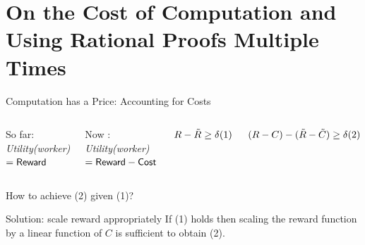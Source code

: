 \section{On the Cost of Computation and Using Rational Proofs Multiple Times}

\begin{frame}{Computation has a Price: Accounting for Costs}
	\begin{columns}
	\begin{block}{So far:}
		\textit{Utility(worker)} $ = \mathsf{Reward}$
	\end{block}
	\begin{block}{Now :}
		\textit{Utility(worker)} $= \mathsf{Reward} - \mathsf{Cost}$
	\end{block}
	\begin{block}{}
		$R - \tilde{R} \geq \delta \hspace*{\fill} (1) \hspace*{\fill}$
	\end{block}
	\begin{block}{}
		$(R-C) - (\tilde{R}-\tilde{C}) \geq \delta \hspace*{\fill} (2) \hspace*{\fill}$			
	\end{block}
	\end{columns}
	\bigskip
\begin{block}{How to achieve (2) given (1)?}
\end{block}
	\begin{block}{Solution: scale reward appropriately}
		If (1) holds then scaling the reward function by a linear function of $C$ is sufficient to obtain (2).
	\end{block}
\end{frame}

